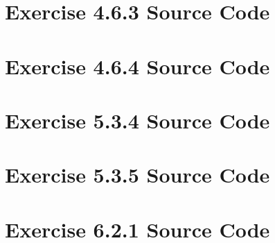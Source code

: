 \documentclass[letterpaper]{report}
\begin{document}
\newpage



\appendix

\chapter{Exercise 4.6.3 Source Code}



\newpage

\chapter{Exercise 4.6.4 Source Code}



\newpage

\chapter{Exercise 5.3.4 Source Code}



\newpage

\chapter{Exercise 5.3.5 Source Code}



\newpage

\chapter{Exercise 6.2.1 Source Code}


\end{document}
